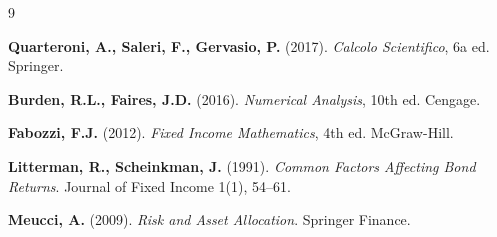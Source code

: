 \documentclass[11pt,a4paper]{article}
\theoremstyle{plain}
\theoremstyle{definition}
\theoremstyle{remark}
\begin{document}
\renewcommand{\refname}{Riferimenti bibliografici}
\begin{thebibliography}{9}

  \textbf{Quarteroni, A., Saleri, F., Gervasio, P.} (2017).
  \textit{Calcolo Scientifico}, 6a ed. Springer.

  \textbf{Burden, R.L., Faires, J.D.} (2016).
  \textit{Numerical Analysis}, 10th ed. Cengage.

  \textbf{Fabozzi, F.J.} (2012).
  \textit{Fixed Income Mathematics}, 4th ed. McGraw-Hill.

  \textbf{Litterman, R., Scheinkman, J.} (1991).
  \textit{Common Factors Affecting Bond Returns}.
  Journal of Fixed Income 1(1), 54--61.

  \textbf{Meucci, A.} (2009).
  \textit{Risk and Asset Allocation}. Springer Finance.

\end{thebibliography}
\end{document}
